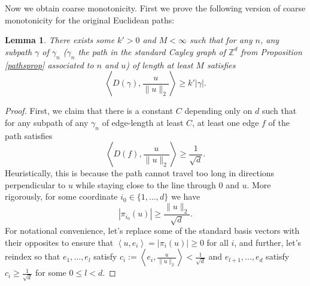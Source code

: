 \documentclass[12pt,reqno]{article}
\numberwithin{equation}{section}
\newcommand{\Z}{\mathbb{Z}}
\newcommand{\pair}[2]{\left\langle #1, #2 \right\rangle}
\newtheorem{lemma}{Lemma}
\begin{document}
Now we obtain coarse monotonicity.
First we prove the following version of coarse monotonicity for the original Euclidean paths:
\begin{lemma} \label{euclideanmonotonicity}
There exists some $k' > 0$ and $M < \infty$ such that for any $n$, any subpath $\gamma$ of $\gamma_n$ ($\gamma_n$ the path 
in the standard Cayley graph of $\Z^d$ from
Proposition \ref{pathsprop} associated to $n$ and $u$) of length at least $M$ satisfies
\[ \pair{ D(\gamma) }{ \frac{u}{ \|u\|_2 }} \ge k' |\gamma|. \]
\end{lemma}
\begin{proof}
First, we claim that there is a constant $C$ depending only on $d$ such that for any subpath of any $\gamma_n$ of edge-length at
least $C$, at least one edge $f$ of the path satisfies
\[ \pair{D(f)}{\frac{u}{\|u\|_2}} \ge \frac{1}{\sqrt{d}}. \]
Heuristically, this is because the path cannot travel too long in directions perpendicular to $u$ while staying close to the line
through $0$ and $u$.
More rigorously, for some coordinate $i_0 \in \{1,...,d\}$ we have
\[ 
   | \pi_{i_0}(u) | \ge \frac{ \| u \|_2 }{ \sqrt{d} }.
\]
For notational convenience, let's replace some of the standard basis vectors with their opposites
to ensure that $\pair{u}{e_i} = |\pi_i(u)| \ge 0$ for all $i$, and further, let's reindex so that $e_1,...,e_{l}$ satisfy 
$c_i:=\pair{ e_i }{\frac{u}{\|u\|_2}} < \frac{1}{\sqrt{d}}$
and $e_{l+1},...,e_d$ satisfy $c_i \ge \frac{1}{\sqrt{d}}$ for some $0 \le l < d$.


\end{proof}
\end{document}
